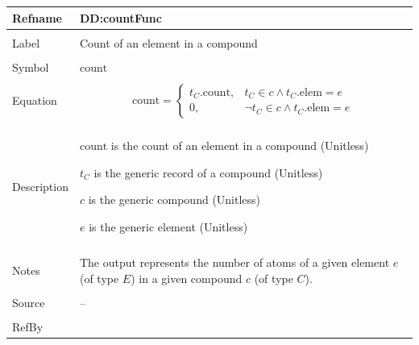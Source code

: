 \documentclass[12pt]{article}
\begin{document}
\vspace{\baselineskip}
\noindent
\begin{minipage}{\textwidth}
\begin{tabular}{>{\raggedright}p{}>{\raggedright\arraybackslash}p{}}
\toprule \textbf{Refname} & \textbf{DD:countFunc}
\label{DD:countFunc}
\\ \midrule \\
Label & Count of an element in a compound
        
\\ \midrule \\
Symbol & $\text{count}$
         
\\ \midrule \\
Equation & \begin{displaymath}
           \text{count}=\begin{cases}
                        {t_{C}}\text{.count}, & {t_{C}}\in{}c\land{}{t_{C}}\text{.elem}=e\\
                        0, & \neg{}{t_{C}}\in{}c\land{}{t_{C}}\text{.elem}=e
                        \end{cases}
           \end{displaymath}
\\ \midrule \\
Description & \begin{symbDescription}
              \item{$\text{count}$ is the count of an element in a compound (Unitless)}
              \item{${t_{C}}$ is the generic record of a compound (Unitless)}
              \item{$c$ is the generic compound (Unitless)}
              \item{$e$ is the generic element (Unitless)}
              \end{symbDescription}
\\ \midrule \\
Notes & The output represents the number of atoms of a given element $e$ (of type $E$) in a given compound $c$ (of type $C$).
        
\\ \midrule \\
Source & --
         
\\ \midrule \\
RefBy & 
\\ \bottomrule
\end{tabular}
\end{minipage}
\end{document}
